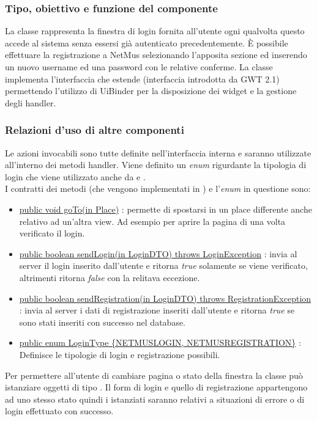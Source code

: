 \subsubsection*{Tipo, obiettivo e funzione del componente}
La classe  rappresenta la finestra di login fornita all'utente
ogni qualvolta questo accede al sistema senza essersi gi\`a autenticato
precedentemente. \`E possibile effettuare la registrazione a NetMus
selezionando l'apposita sezione ed inserendo un nuovo username ed una password
con le relative conferme. La classe  implementa l'interfaccia
 che estende  (interfaccia introdotta da GWT 2.1)
permettendo l'utilizzo di UiBinder per la disposizione dei widget e la gestione
degli handler. 
\subsubsection*{Relazioni d'uso di altre componenti} Le azioni invocabili
sono tutte definite nell'interfaccia interna
 e saranno utilizzate all'interno dei metodi handler. Viene
definito un \emph{enum} rigurdante la tipologia di login che viene utilizzato
anche da  e . \\ I contratti dei metodi (che vengono
implementati in ) e l'\emph{enum} in questione sono:
\begin{itemize}
  \item \underline{public void goTo(in Place)} : permette di spostarsi in un
  place differente anche relativo ad un'altra view. Ad esempio per aprire la pagina di
   una volta verificato il login.
  \item \underline{public boolean sendLogin(in LoginDTO) throws  LoginException}
  : invia al server il login inserito dall'utente e ritorna \emph{true} solamente se viene
  verificato, altrimenti ritorna \emph{false} con la relitava eccezione.
  \item \underline{public boolean sendRegistration(in LoginDTO) throws
  RegistrationException} : invia al server i dati di registrazione inseriti
  dall'utente e ritorna \emph{true} se sono stati inseriti con successo nel database.
  \item \underline{public enum LoginType \{NETMUSLOGIN, NETMUSREGISTRATION\}} :
  Definisce le tipologie di login e registrazione possibili.
\end{itemize}
Per permettere all'utente di cambiare pagina o stato della finestra la classe
pu\`o istanziare oggetti di tipo . Il form di login e quello di
registrazione appartengono ad uno stesso stato quindi i 
istanziati saranno relativi a situazioni di errore o di login effettuato con successo. 
